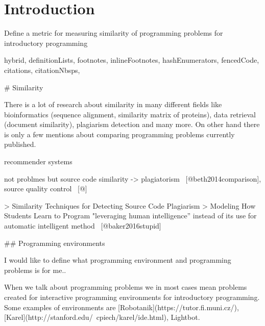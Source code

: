 \documentclass[
  digital, %
  table,   %
  lof,     %
  lot,     %
]{fithesis3}
\begin{document}
\chapter*{Introduction}

Define a metric for measuring similarity of programming problems
for introductory programming

\begin{markdown*}{%
  hybrid,
  definitionLists,
  footnotes,
  inlineFootnotes,
  hashEnumerators,
  fencedCode,
  citations,
  citationNbsps,
}

%
%


%
%

# Similarity

There is a lot of research about similarity in many different fields like bioinformatics (sequence alignment, similarity matrix of proteins), data retrieval (document similarity), plagiarism detection and many more. On other hand there is only a few mentions about comparing programming problems currently published.

recommender systems

not problmes but source code similarity -> plagiatorism ~[@beth2014comparison], source quality control ~[@]

> Similarity Techniques for Detecting Source Code Plagiarism
> Modeling How Students Learn to Program
"leveraging human intelligence” instead of its use for automatic intelligent method ~[@baker2016stupid]

## Programming environments

I would like to define what programming environment and programming problems is for me..

When we talk about programming problems we in most cases mean problems created for interactive programming environments for introductory programming. Some examples of environments are [Robotanik](https://tutor.fi.muni.cz/), [Karel](http://stanford.edu/~cpiech/karel/ide.html), Lightbot.


\end{markdown*}
\end{document}
